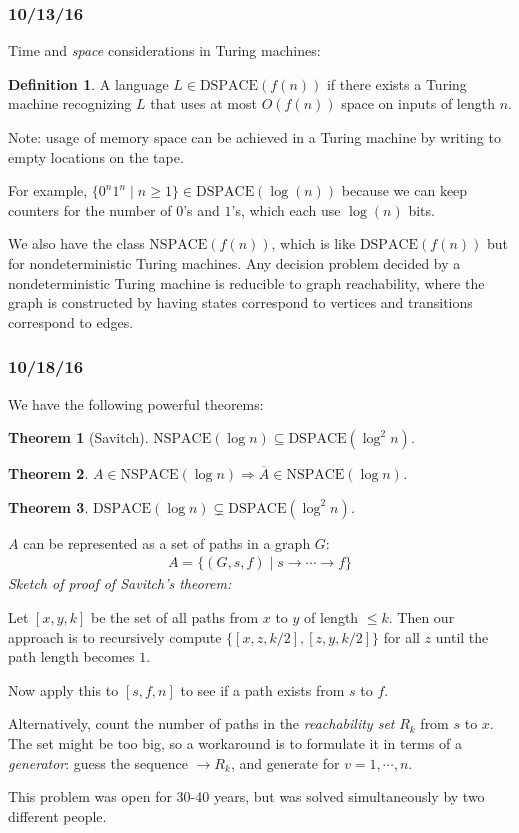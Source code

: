 \documentclass[a4paper,12pt]{article}
\newtheorem{theorem}{Theorem}
\theoremstyle{remark}
\theoremstyle{definition}
\newtheorem{definition}{Definition}
\begin{document}
\subsubsection*{10/13/16}
Time and \emph{space} considerations in Turing machines:
\begin{definition}
    A language $L \in \text{DSPACE}(f(n))$ if there exists a Turing machine recognizing $L$ that uses at most $O(f(n))$ space on inputs of length $n$.
\end{definition}
Note: usage of memory space can be achieved in a Turing machine by writing to empty locations on the tape. \par
For example, $\{ 0^n 1^n \mid n \geq 1 \} \in \text{DSPACE}(\log(n))$ because we can keep counters for the number of $0$'s and $1$'s, which each use $\log(n)$ bits. \par
We also have the class $\text{NSPACE}(f(n))$, which is like $\text{DSPACE}(f(n))$ but for nondeterministic Turing machines. Any decision problem decided by a nondeterministic Turing machine is reducible to graph reachability, where the graph is constructed by having states correspond to vertices and transitions correspond to edges.

\subsubsection*{10/18/16}
We have the following powerful theorems:
\begin{theorem}[Savitch]
    $\text{NSPACE}(\log n) \subseteq \text{DSPACE}(\log^2 n)$.
\end{theorem}
\begin{theorem}
    $A \in \text{NSPACE}(\log n) \Rightarrow \overline{A} \in \text{NSPACE}(\log n)$.
\end{theorem}
\begin{theorem}
    $\text{DSPACE}(\log n) \subsetneq \text{DSPACE}(\log^2 n)$.
\end{theorem}
$A$ can be represented as a set of paths in a graph $G$:
\begin{align*}
    A = \{ (G, s, f) \mid s \rightarrow \cdots \rightarrow f \}
\end{align*}
\textit{Sketch of proof of Savitch's theorem:} \par
Let $[x, y, k]$ be the set of all paths from $x$ to $y$ of length $\leq k$. Then our approach is to recursively compute $\{ [x, z, k/2], [z, y, k/2] \}$ for all $z$ until the path length becomes $1$. \par
Now apply this to $[s, f, n]$ to see if a path exists from $s$ to $f$. \par
Alternatively, count the number of paths in the \emph{reachability set} $R_k$ from $s$ to $x$. The set might be too big, so a workaround is to formulate it in terms of a \emph{generator}: guess the sequence $\rightarrow R_k$, and generate for $v = 1, \cdots, n$. \par
This problem was open for 30-40 years, but was solved simultaneously by two different people.
\end{document}
